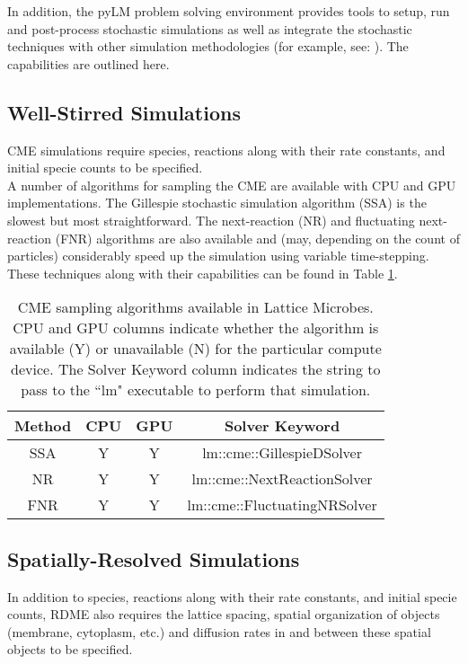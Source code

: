 In addition, the pyLM problem solving environment provides tools to setup, run and post-process stochastic simulations as well as integrate the stochastic techniques with other simulation methodologies (for example, see: \cite{Cole2014sso}).  The capabilities are outlined here.

\subsection{Well-Stirred Simulations}
CME simulations require species, reactions along with their rate constants, and initial specie counts to be specified.\\

A number of algorithms for sampling the CME are available with CPU and GPU implementations.  The Gillespie stochastic simulation algorithm (SSA) \cite{Gillespie1977ess} is the slowest but most straightforward.  The next-reaction (NR) and fluctuating next-reaction (FNR) \cite{Gibson2000ees} algorithms are also available and (may, depending on the count of particles) considerably speed up the simulation using variable time-stepping.  These techniques along with their capabilities can be found in Table \ref{tbl:cmeAlgorithms}. 


\begin{table}[htp]
\begin{center}
\begin{tabular}{|c|c|c|c|}
\hline
\textbf{Method} & \textbf{CPU} & \textbf{GPU} & \textbf{Solver Keyword} \\
\hline\hline
SSA & Y & Y & lm::cme::GillespieDSolver \\
\hline
NR & Y & Y & lm::cme::NextReactionSolver \\
\hline
FNR & Y & Y & lm::cme::FluctuatingNRSolver \\
\hline
\end{tabular}
\end{center}
\caption{CME sampling algorithms available in Lattice Microbes.  CPU and GPU columns indicate whether the algorithm is available (Y) or unavailable (N) for the particular compute device.  The Solver Keyword column indicates the string to pass to the ``lm" executable to perform that simulation.} \label{tbl:cmeAlgorithms}
\end{table}%





\subsection{Spatially-Resolved Simulations}
In addition to species, reactions along with their rate constants, and initial specie counts, RDME also requires the lattice spacing, spatial organization of objects (membrane, cytoplasm, etc.) and diffusion rates in and between these spatial objects to be specified.  \\


